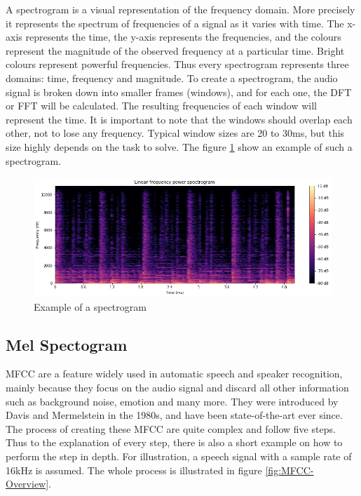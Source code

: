 A spectrogram is a visual representation of the frequency domain. More precisely it represents the spectrum of frequencies of a signal as it varies with time. The x-axis represents the time, the y-axis represents the frequencies, and the colours represent the magnitude of the observed frequency at a particular time. Bright colours represent powerful frequencies. Thus every spectrogram represents three domains: time, frequency and magnitude.
\newline
\newline
To create a spectrogram, the audio signal is broken down into smaller frames (windows), and for each one, the \gls{DFT} or \gls{FFT} will be calculated. The resulting frequencies of each window will represent the time. It is important to note that the windows should overlap each other, not to lose any frequency. Typical window sizes are 20 to 30ms, but this size highly depends on the task to solve. The figure \ref{fig:Spectrogram} show an example of such a spectrogram.
\begin{figure}[htbp]
	\centering
	\includegraphics[scale=0.5]{baa-documentation/img/Spectrogram_Visualisation.png}
	\caption[Example of a spectrogram]{Example of a spectrogram}
	\label{fig:Spectrogram}
\end{figure}

\subsection{Mel Spectogram}
\label{sub:Mel-Spectogram}

\gls{MFCC} are a feature widely used in automatic speech and speaker recognition, mainly because they focus on the audio signal and discard all other information such as background noise, emotion and many more. They were introduced by Davis and Mermelstein in the 1980s, and have been state-of-the-art ever since.
\newline
\newline
The process of creating these \gls{MFCC} are quite complex and follow five steps. Thus to the explanation of every step, there is also a short example on how to perform the step in depth. For illustration, a speech signal with a sample rate of 16kHz is assumed. The whole process is illustrated in figure \ref{fig:MFCC-Overview}.


